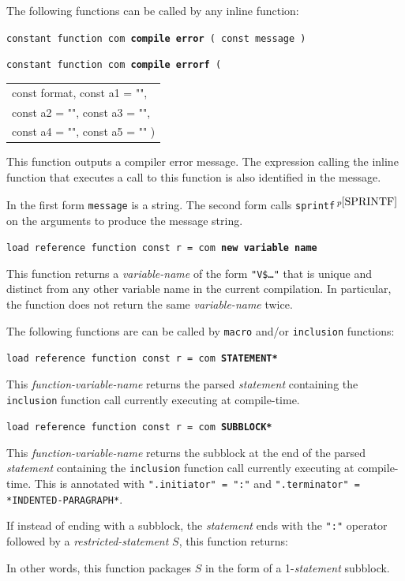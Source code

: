 \documentclass[12pt]{article}
\newcommand{\ttkey}[1]{{\tt \bfseries #1}}
\newcommand{\pagnote}[1]{$\,^{p\pageref{#1}}$}
\newenvironment{indpar}[1][0.3in]%
	{\begin{list}{}%
		     {\setlength{\itemsep}{0in}%
		      \setlength{\topsep}{0in}%
		      \setlength{\parsep}{1ex}%
		      \setlength{\labelwidth}{#1}%
		      \setlength{\leftmargin}{#1}%
		      \addtolength{\leftmargin}{\labelsep}}%
	 \item}%
	{\end{list}}
\begin{document}
The following functions can be called by any inline function:

{\tt constant function com \ttkey{compile error} ( const message )}%
	\label{COMPILE-ERROR} \\
{\tt constant function com \ttkey{compile errorf}
     ( \begin{tabular}[t]{@{}l}
	const format, const a1 = "", \\
	const a2 = "", const a3 = "", \\
	const a4 = "", const a5 = "" )
	\end{tabular} }
\begin{indpar}
This function outputs a compiler error message.  The expression calling
the inline function that executes a call to this function is also
identified in the message.

In the first form {\tt message} is a string.  The second form
calls {\tt sprintf}\pagnote{SPRINTF} on the arguments to produce
the message string.

\end{indpar}

{\tt load reference function const r = com \ttkey{new variable name} }%
\label{NEW-VARIABLE-NAME}
\begin{indpar}
This function returns a {\em variable-name} of the form {\tt "V\$\ldots"}
that is unique and distinct from any other variable name in the current
compilation.  In particular, the function does not return the same
{\em variable-name} twice.
\end{indpar}

The following functions are can be called by {\tt macro} and/or
{\tt inclusion} functions:

{\tt load reference function const r = com \ttkey{*STATEMENT*} }%
\label{COM-STATEMENT}
\begin{indpar}
This {\em function-variable-name} returns the parsed {\em statement}
containing the {\tt inclusion} function call
currently executing at compile-time.
\end{indpar}

{\tt load reference function const r = com \ttkey{*SUBBLOCK*} }%
\label{COM-SUBBLOCK}
\begin{indpar}
This {\em function-variable-name} returns the subblock at the end
of the parsed {\em statement}
containing the {\tt inclusion} function call
currently executing at compile-time.
This is annotated with {\tt ".initiator" = ":"} and
{\tt ".terminator" = *INDENTED-PARAGRAPH*}.

If instead of ending with a subblock, the {\em statement} ends with the
{\tt ":"} operator followed by a {\em restricted-statement} $S$,
this function returns: \\

In other words, this function packages $S$ in the form of a 1-{\em statement}
subblock.
\end{indpar}
\end{document}
